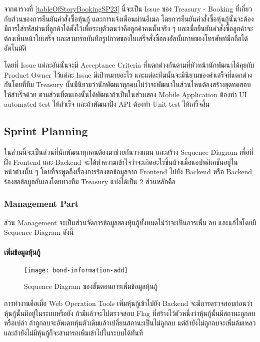 จากตารางที่ \ref{tableOfStoryBookingSP23}  นี้จะเป็น Issue ของ Treasury - Booking ที่เกี่ยวกับส่วนของการยืนยันคำสั่งซืิ้อหุ้นกู้ และการแจ้งเตือนผ่านอีเมล 
โดยการยืนยันคำสั่งซื้อหุ้นกู้นั้นจะต้องมีการใส่รหัสผ่านที่ลูกค้าได้ตั้งไว้เพื่อระบุตัวตนว่าคือลูกค้าคนนั้นจริง ๆ และเมื่อยืนยันคำสั่งซื้อลูกค้าจะต้องเห็นหน้าใบเสร็จ 
และสามารถบันทึกรูปภาพของใบเสร็จสั่งซื้อลงอัลบั้มภาพของโทรศัพท์มือถือได้อัตโนมัติ

โดยที่ Issue แต่ละอันนั้นจะมี Acceptance Criteria ที่แตกต่างกันตามที่หัวหน้านักพัฒนาได้คุยกับ Product Owner ไว้แต่ละ Issue มีเป้าหมายอะไร
และแต่ละทีมนั้นจะมีนิยามของคำเสร็จที่แตกต่างกันโดยที่ทีม Treasury นั้นมีนิยามว่านักพัฒนาทุกคนไม่ว่าจะพัฒนาในส่วนไหนต้องสร้างชุดทดสอบให้สำเร็จด้วย
ตามส่วนที่ตนเองนั้นได้พัฒนาถ้าเป็นในส่วนของ Mobile Application ต้องทำ UI automated test ให้สำเร็จ และถ้าพัฒนาฝั่ง API ต้องทำ Unit test
ให้เสร็จสิ้น

\subsection{Sprint Planning}
ในส่วนนี้จะเป็นส่วนที่นักพัฒนาทุกคนต้องมาช่วยกันวางแผน และสร้าง Sequence Diagram เพื่อที่ฝั่ง Frontend และ Backend
จะได้ทำความเข้าใจว่าจะเกิดอะไรขึ้นบ้างเมื่อแอปพลิเคชันอยู่ในหน้าต่างนั้น ๆ โดยที่จะพูดถึงเรื่องการร้องขอข้อมูลจาก Frontend
ไปยัง Backend หรือ Backend ร้องขอข้อมูลกันเองโดยทางทีม Treasury แบ่งได้เป็น 2 ส่วนหลักคือ

\setcounter{secnumdepth}{5} 
\subsubsection{Management Part}
ส่วน Management จะเป็นส่วนจัดการข้อมูลของหุ้นกู้ทั้งหมดไม่ว่าจะเป็นการเพิ่ม ลบ และแก้ไขโดยมี Sequence Diagram ดังนี้

\paragraph{เพิ่มข้อมูลหุ้นกู้}
\begin{figure}[H]
    \centering
    \texttt{[image: bond-information-add]}
    \caption{Sequence Diagram ของขั้นตอนการเพิ่มข้อมูลหุ้นกู้}\label{bond-information-add}
\end{figure}
การทำงานคือเมื่อ Web Operation Tools เพิ่มหุ้นกู้เข้าไปยัง Backend จะมีการตรวจสอบก่อนว่าหุ้นกู้นั้นมีอยู่ในระบบหรือยัง
ถ้ามีแล้วจะไปตรวจสอบ Flag ที่สร้างไว้ตัวหนึ่งว่าหุ้นกู้นั้นมีสถานะถูกลบหรือเปล่า ถ้าถูกลบจะอัพเดทหุ้นตัวเดิมแล้วเปลี่ยนสถานะเป็นไม่ถูกลบ
แต่ถ้ายังไม่ถูกลบจะเพิ่มล้มเหลว และถ้ายังไม่มีหุ้นกู้ก็จะสามารถเพิ่มเข้าไปในระบบได้ทันที

